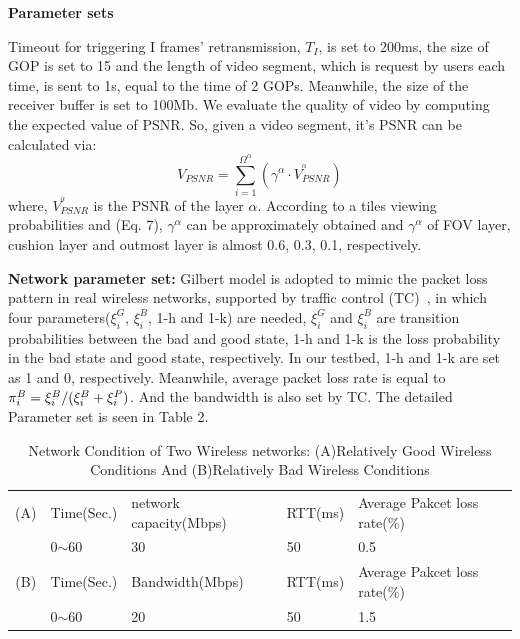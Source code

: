 \textbf{Parameter sets}

Timeout for triggering I frames' retransmission, $T_I$, is set to 200ms, the size of GOP is set to 15 and the length of video segment, which is request by users each time, is sent to 1s, equal to the time of 2 GOPs. Meanwhile, the size of the receiver buffer is set to 100Mb.
We evaluate the quality of video by computing the expected value of PSNR. So, given a video segment, it's PSNR can be calculated via: \[{V_{PSNR}} = \sum\limits_{i = 1}^{{\Omega ^\alpha }} {({\gamma ^\alpha } \cdot V_{PSNR}^{^\alpha })} \]
where, ${V_{PSNR}^{^\alpha }}$ is the PSNR of the layer $\alpha$. According to a tiles viewing probabilities \cite{360ProbDASH} and (Eq. 7), $\gamma ^\alpha$ can be approximately obtained and $\gamma ^\alpha$ of FOV layer, cushion layer and outmost layer is almost 0.6, 0.3, 0.1, respectively.

\textbf{Network parameter set:} Gilbert model is adopted to mimic the packet loss pattern in real wireless networks, supported by traffic control (TC)~\cite{TC}, in which four parameters($\xi _i^G$, $\xi _i^B$, 1-h and 1-k) are needed, $\xi _i^G$ and $\xi _i^B$ are transition probabilities between the bad and good state, 1-h and 1-k is the loss probability in the bad state and good state, respectively. In our testbed, 1-h and 1-k are set as 1 and 0, respectively. Meanwhile, average packet loss rate is equal to $\pi _i^B = \xi _i^B/(\xi _i^B\\ + \xi _i^P)$. And the bandwidth is also set by TC. The detailed Parameter set is seen in Table 2. 

\begin{table}
	\centering 
	\scriptsize
	\begin{tabular}{cp{1.0cm}p{1.6cm}p{0.8cm}p{2.3cm}}
		\rowcolor[gray]{0.9} 
		\hline
		(A)  &  Time(Sec.)    & network capacity(Mbps)       &  RTT(ms) &  Average Pakcet loss rate(\%) \\

		
		&  0${\sim}$60   &  30         &    50    &  0.5 \\

		\hline
		\rowcolor[gray]{0.9}
		\hline
		(B)  &   Time(Sec.)   & Bandwidth(Mbps)       &  RTT(ms) &     Average Pakcet loss rate(\%)  \\
		
		&  0${\sim}$60   &  20         &    50    &  1.5\\
		
		\hline
		
	\end{tabular}
	\caption{Network Condition of Two Wireless networks: (A)Relatively Good Wireless Conditions And (B)Relatively Bad Wireless Conditions}
	\label{}
\end{table}


